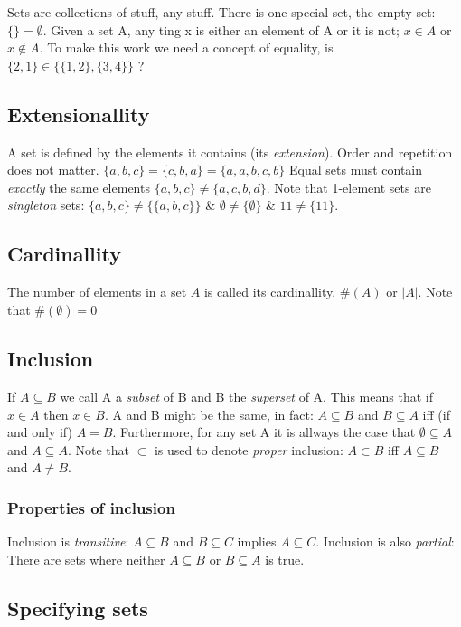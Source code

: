 \documentclass[12pt]{article} %
\begin{document}
Sets are collections of stuff, any stuff. There is one special set, the empty set: $\{\} = \emptyset$. Given a set A, any ting x is either an element of A or it is not; $x \in A$ or $x \notin A$. To make this work we need a concept of equality, is $\{2,1\} \in \{\{1,2\},\{3,4\}\}$ ? 

\subsection{Extensionallity}
A set is defined by the elements it contains (its \textit{extension}). Order and repetition does not matter. $\{a,b,c\} = \{c,b,a\} = \{a,a,b,c,b\}$ Equal sets must contain \textit{exactly} the same elements $\{a,b,c\} \neq \{a,c,b,d\}$. Note that 1-element sets are \textit{singleton} sets: $\{a,b,c\} \neq \{\{a,b,c\}\}$ \& $\emptyset \neq \{\emptyset\}$ \& $11 \neq \{11\}$.

\subsection{Cardinallity}

The number of elements in a set $A$ is called its cardinallity. $\#(A)$ or $|A|$. Note that $\#(\emptyset) = 0$

\subsection{Inclusion}
If $A \subseteq B$ we call A a \textit{subset} of B and B the \textit{superset} of A. This means that if $x \in A$ then $x \in B$. A and B might be the same, in fact: $A \subseteq B$ and $B \subseteq A$ iff (if and only if) $A = B$. Furthermore, for any set A it is allways the case that $\emptyset \subseteq A$ and $A \subseteq A$. Note that $\subset$ is used to denote \textit{proper} inclusion: $A \subset B$ iff $A \subseteq B$ and $A \neq B$.

\subsubsection{Properties of inclusion}
Inclusion is \textit{transitive}: $A \subseteq B$ and $B \subseteq C$ implies $A \subseteq C$. Inclusion is also \textit{partial}: There are sets where neither $A \subseteq B$ or $B \subseteq A$ is true.

\subsection{Specifying sets}
\end{document}
